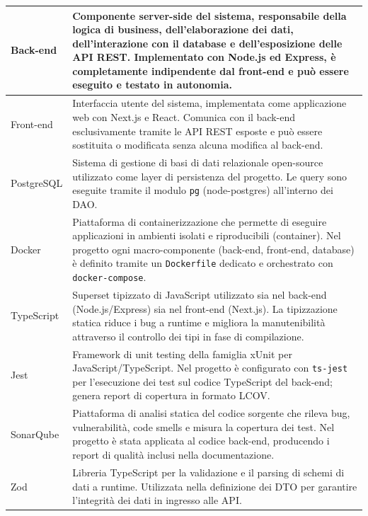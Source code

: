 \documentclass[a4paper,11pt]{article}
\begin{document}
\begin{longtable}{|p{4.2cm}|p{10.5cm}|}
Back-end &
Componente server-side del sistema, responsabile della logica di business, dell'elaborazione dei dati, dell'interazione con il database e dell'esposizione delle API REST. Implementato con Node.js ed Express, è completamente indipendente dal front-end e può essere eseguito e testato in autonomia. \\ \hline

Front-end &
Interfaccia utente del sistema, implementata come applicazione web con Next.js e React. Comunica con il back-end esclusivamente tramite le API REST esposte e può essere sostituita o modificata senza alcuna modifica al back-end. \\ \hline

PostgreSQL &
Sistema di gestione di basi di dati relazionale open-source utilizzato come layer di persistenza del progetto. Le query sono eseguite tramite il modulo \texttt{pg} (node-postgres) all'interno dei DAO. \\ \hline

Docker &
Piattaforma di containerizzazione che permette di eseguire applicazioni in ambienti isolati e riproducibili (container). Nel progetto ogni macro-componente (back-end, front-end, database) è definito tramite un \texttt{Dockerfile} dedicato e orchestrato con \texttt{docker-compose}. \\ \hline

TypeScript &
Superset tipizzato di JavaScript utilizzato sia nel back-end (Node.js/Express) sia nel front-end (Next.js). La tipizzazione statica riduce i bug a runtime e migliora la manutenibilità attraverso il controllo dei tipi in fase di compilazione. \\ \hline

Jest &
Framework di unit testing della famiglia xUnit per JavaScript/TypeScript. Nel progetto è configurato con \texttt{ts-jest} per l'esecuzione dei test sul codice TypeScript del back-end; genera report di copertura in formato LCOV. \\ \hline

SonarQube &
Piattaforma di analisi statica del codice sorgente che rileva bug, vulnerabilità, code smells e misura la copertura dei test. Nel progetto è stata applicata al codice back-end, producendo i report di qualità inclusi nella documentazione. \\ \hline

Zod &
Libreria TypeScript per la validazione e il parsing di schemi di dati a runtime. Utilizzata nella definizione dei DTO per garantire l'integrità dei dati in ingresso alle API. \\ \hline


\end{longtable}
\end{document}
